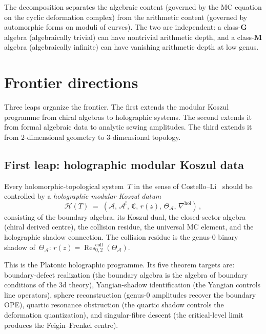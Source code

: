 \documentclass[11pt,reqno]{amsart}
\theoremstyle{definition}
\theoremstyle{remark}
\newcommand{\cA}{\mathcal{A}}
\newcommand{\cH}{\mathcal{H}}
\newcommand{\Res}{\operatorname{Res}}
\numberwithin{equation}{section}
\begin{document}
The decomposition separates the algebraic content
(governed by the MC equation on the cyclic deformation
complex) from the arithmetic content (governed by
automorphic forms on moduli of curves). The two are
independent: a class-$\mathbf{G}$ algebra (algebraically
trivial) can have nontrivial arithmetic depth, and a
class-$\mathbf{M}$ algebra (algebraically infinite)
can have vanishing arithmetic depth at low genus.


\section{Frontier directions}
\label{sec:frontier}

Three leaps organize the frontier. The first extends the
modular Koszul programme from chiral algebras to
holographic systems. The second extends it from formal
algebraic data to analytic sewing amplitudes. The third
extends it from $2$-dimensional geometry to
$3$-dimensional topology.

\subsection{First leap: holographic modular Koszul data}
\label{ssec:holographic-frontier}

Every holomorphic-topological system~$T$ in the sense of
Costello--Li~\cite{CL16} should be controlled by a \emph{holographic
modular Koszul datum}
\begin{equation}\label{eq:holographic-datum-frontier}
\cH(T)
\;=\;
(\cA,\, \cA^!,\, \mathfrak{C},\, r(z),\,
\Theta_\cA,\, \nabla^{\mathrm{hol}})\,,
\end{equation}
consisting of the boundary algebra, its Koszul dual, the
closed-sector algebra (chiral derived centre), the collision
residue, the universal MC element, and the holographic
shadow connection. The collision residue is the genus-$0$
binary shadow of~$\Theta_\cA$:
$r(z) = \Res^{\mathrm{coll}}_{0,2}(\Theta_\cA)$.

This is the Platonic holographic programme. Its five
theorem targets are: boundary-defect realization (the
boundary algebra is the algebra of boundary conditions
of the $3$d theory), Yangian-shadow identification (the
Yangian controls line operators), sphere reconstruction
(genus-$0$ amplitudes recover the boundary OPE), quartic
resonance obstruction (the quartic shadow controls the
deformation quantization), and singular-fibre descent (the
critical-level limit produces the Feigin--Frenkel centre).
\end{document}
